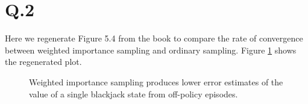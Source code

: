 \documentclass[12pt] {article}
\begin{document}
\section*{Q.2}
Here we regenerate Figure 5.4 from the book to compare the rate of convergence between weighted importance sampling and ordinary sampling. Figure \ref{fig:c} shows the regenerated plot.

\begin{figure}[!tbh]
\centering        
   \caption{Weighted importance sampling produces lower error estimates of the value of a single blackjack state from off-policy episodes. }
   \label{fig:c}
\end{figure}
\end{document}
